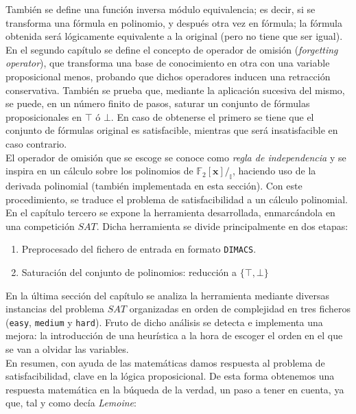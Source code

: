 También se define una función inversa módulo equivalencia; es decir, si se transforma una fórmula en polinomio, y después otra vez en fórmula; la fórmula obtenida será lógicamente equivalente a la original (pero no tiene que ser igual).\\

En el segundo capítulo se define el concepto de operador de omisión (\textit{forgetting operator}), que transforma una base de conocimiento en otra con una variable proposicional menos, probando que dichos operadores inducen una retracción conservativa. También se prueba que, mediante la aplicación sucesiva del mismo, se puede, en un número finito de pasos, saturar un conjunto de fórmulas proposicionales en $\top$ ó $\bot$. En caso de obtenerse el primero se tiene que el conjunto de fórmulas original es satisfacible, mientras que será insatisfacible en caso contrario.\\

El operador de omisión que se escoge se conoce como \textit{regla de independencia} \cite{original} y se inspira en un cálculo sobre los polinomios de $\mathbb{F}_2[\textbf{x}] /_{\mathbb{I}}$, haciendo uso de la derivada polinomial (también implementada en esta sección). Con este procedimiento, se traduce el problema de satisfacibilidad a un cálculo polinomial.\\

En el capítulo tercero se expone la herramienta desarrollada, enmarcándola en una competición $SAT$. Dicha herramienta se divide principalmente en dos etapas: 

\begin{enumerate}
\item Preprocesado del fichero de entrada en formato \texttt{DIMACS}.
\item Saturación del conjunto de polinomios: reducción a $\{ \top , \bot\}$
\end{enumerate}

En la última sección del capítulo se analiza la herramienta mediante diversas instancias del problema $SAT$ organizadas en orden de complejidad en tres ficheros (\texttt{easy}, \texttt{medium} y \texttt{hard}). Fruto de dicho análisis se detecta e implementa una mejora: la introducción de una heurística a la hora de escoger el orden en el que se van a olvidar las variables.\\

En resumen, con ayuda de las matemáticas damos respuesta al problema de satisfacibilidad, clave en la lógica proposicional. De esta forma obtenemos una respuesta matemática en la búqueda de la verdad, un paso a tener en cuenta, ya que, tal y como decía \textit{Lemoine}:

